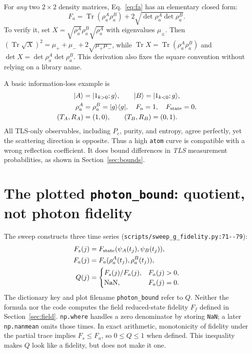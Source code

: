 \documentclass[11pt,a4paper]{article}
\newcommand{\ket}[1]{\lvert #1\rangle}
\newcommand{\bra}[1]{\langle #1\rvert}
\newcommand{\code}[1]{\nolinkurl{#1}}
\newcommand{\Tr}{\operatorname{Tr}}
\begin{document}
For \emph{any} two $2\times2$ density matrices, Eq.~\eqref{eq:fa} has an elementary closed form:
\begin{equation}
 F_a=\Tr(\rho_a^A\rho_a^B)
 +2\sqrt{\det\rho_a^A\det\rho_a^B}.
 \label{eq:qubitfidelity}
\end{equation}
To verify it, set $X=\sqrt{\rho_a^A}\rho_a^B\sqrt{\rho_a^A}$ with eigenvalues $\mu_\pm$. Then $(\Tr\sqrt X)^2=\mu_++\mu_-+2\sqrt{\mu_+\mu_-}$, while $\Tr X=\Tr(\rho_a^A\rho_a^B)$ and $\det X=\det\rho_a^A\det\rho_a^B$. This derivation also fixes the square convention without relying on a library name.

A basic information-loss example is
\begin{equation}
 \begin{aligned}
 \ket A&=\ket{1_{k>0};g},\qquad \ket B=\ket{1_{k<0};g},\\
 \rho_a^A&=\rho_a^B=\ket g\bra g,\quad F_a=1,\quad F_{\rm state}=0,\\
 (T_A,R_A)&=(1,0),\qquad (T_B,R_B)=(0,1).
 \end{aligned}
 \label{eq:atomblind}
\end{equation}
All TLS-only observables, including $P_e$, purity, and entropy, agree perfectly, yet the scattering direction is opposite. Thus a high \code{atom} curve is compatible with a wrong reflection coefficient. It does bound differences in \emph{TLS} measurement probabilities, as shown in Section~\ref{sec:bounds}.

\section[The plotted photon bound: quotient, not photon fidelity]{The plotted \code{photon_bound}: quotient, not photon fidelity}
\label{sec:ratio}
The sweep constructs three time series (\code{scripts/sweep_g_fidelity.py:71--79}):
\begin{align}
 F_s(j)&=F_{\rm state}(\psi_A(t_j),\psi_B(t_j)),\notag\\
 F_a(j)&=F_a(\rho_a^A(t_j),\rho_a^B(t_j)),\notag\\
 Q(j)&=\begin{cases}F_s(j)/F_a(j),&F_a(j)>0,\\\mathrm{NaN},&F_a(j)=0.\end{cases}
 \label{eq:ratio}
\end{align}
The dictionary key and plot filename \code{photon_bound} refer to $Q$. Neither the formula nor the code computes the field reduced-state fidelity $F_f$ defined in Section~\ref{sec:field}. \code{np.where} handles a zero denominator by storing \code{NaN}; a later \code{np.nanmean} omits those times. In exact arithmetic, monotonicity of fidelity under the partial trace implies $F_s\le F_a$, so $0\le Q\le1$ when defined. This inequality makes $Q$ look like a fidelity, but does not make it one.
\end{document}
